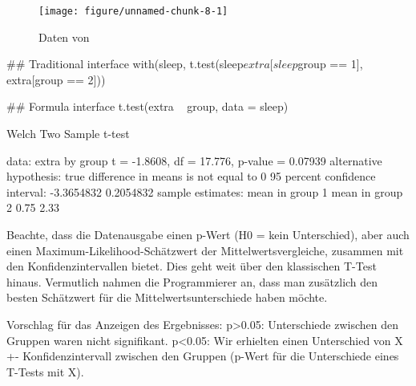 \documentclass[a4paper,twoside]{tufte-book}\usepackage[]{graphicx}\usepackage[]{color}
\begin{document}
\begin{figure}[htbp]
\begin{center}
\begin{Schunk}

\texttt{[image: figure/unnamed-chunk-8-1]} \end{Schunk}
\caption{Daten von \citet{Student-probableerrormean-1908}}
\label{fig: Student Sleep Data}
\end{center}
\end{figure}

\begin{Schunk}
\begin{Sinput}
## Traditional interface
with(sleep, t.test(sleep$extra[sleep$group == 1], extra[group == 2]))
\end{Sinput}
\end{Schunk}

\begin{Schunk}
\begin{Sinput}
## Formula interface
t.test(extra ~ group, data = sleep)
\end{Sinput}
\begin{Soutput}

	Welch Two Sample t-test

data:  extra by group
t = -1.8608, df = 17.776, p-value = 0.07939
alternative hypothesis: true difference in means is not equal to 0
95 percent confidence interval:
 -3.3654832  0.2054832
sample estimates:
mean in group 1 mean in group 2 
           0.75            2.33 
\end{Soutput}
\end{Schunk}

Beachte, dass die Datenausgabe einen p-Wert (H0 = kein Unterschied), aber auch einen Maximum-Likelihood-Schätzwert der Mittelwertsvergleiche, zusammen mit den Konfidenzintervallen bietet. Dies geht weit über den klassischen T-Test hinaus. Vermutlich nahmen die Programmierer an, dass man zusätzlich den besten Schätzwert für die Mittelwertsunterschiede haben möchte.

Vorschlag für das Anzeigen des Ergebnisses: p>0.05: Unterschiede zwischen den Gruppen waren nicht signifikant. p<0.05: Wir erhielten einen Unterschied von X +- Konfidenzintervall zwischen den Gruppen (p-Wert für die Unterschiede eines T-Tests mit X). 
\end{document}
